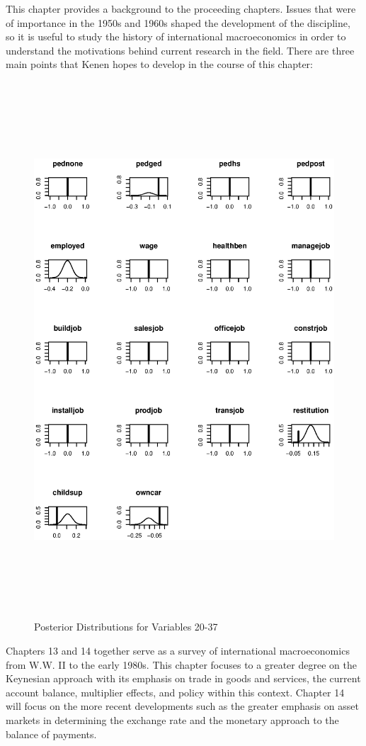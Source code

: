 This chapter provides a background to the proceeding chapters.
Issues that were of importance in the 1950s and 1960s shaped the
development of the discipline, so it is useful to study the history
of international macroeconomics in order to understand the
motivations behind current research in the field. There are three
main points that Kenen hopes to develop in the course of this
chapter: 

\begin{figure}[t]
\begin{center}
\includegraphics[height=20cm,width=14.5cm]{graphapp032.eps}
\caption{Posterior Distributions for Variables 20-37}
\end{center}
\end{figure}

Chapters 13 and 14 together serve as a survey of international
macroeconomics from W.W. II to the early 1980s.  This chapter
focuses to a greater degree on the Keynesian approach with its
emphasis on trade in goods and services, the current account
balance, multiplier effects, and policy within this context. Chapter
14 will focus on the more recent developments such as the greater
emphasis on asset markets in determining the exchange rate and the
monetary approach to the balance of payments.

